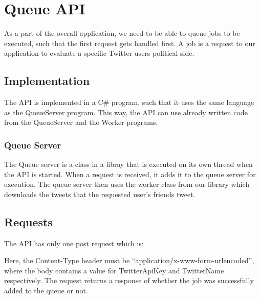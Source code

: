 \chapter{Queue \ac{API}}
As a part of the overall application, we need to be able to queue jobs to be
executed, such that the first request gets handled first. A job is a request to
our application to evaluate a specific Twitter users political side.

\section{Implementation}
The \ac{API} is implemented in a C\# program, such that it uses the same
language as the QueueServer program. This way, the \ac{API} can use already
written code from the QueueServer and the Worker programs.

\subsection{Queue Server}
The Queue server is a class in a libray that is executed on its own thread when
the \ac{API} is started. When a request is received, it adds it to the queue
server for execution. The queue server then uses the worker class from our library which
downloads the tweets that the requested user's friends tweet. 


\section{Requests}
The \ac{API} has only one post request which is: \nl

\nl

Here, the Content-Type header must be ``application/x-www-form-urlencoded'',
where the body contains a value for TwitterApiKey and TwitterName
respectively.
The request returns a response of whether the job was successfully added to the
queue or not.



